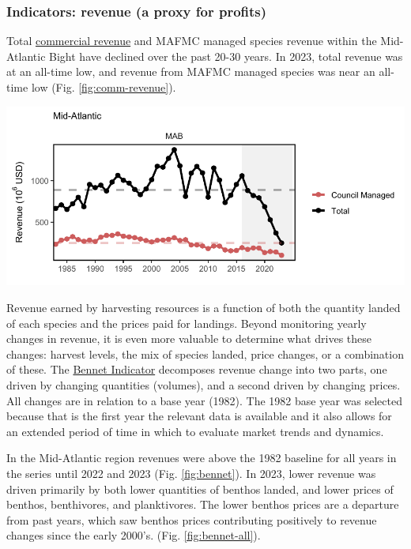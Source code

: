 \documentclass[
  10pt,
]{article}
\let\origfigure\figure
\let\endorigfigure\endfigure
\renewenvironment{figure}[1][2] {
    \expandafter\origfigure\expandafter[H]
} {
    \endorigfigure
}
\begin{document}
\subsubsection{Indicators: revenue (a proxy for profits)}\label{indicators-revenue-a-proxy-for-profits}

Total \href{https://noaa-edab.github.io/catalog/comdat.html}{commercial revenue} and MAFMC managed species revenue within the Mid-Atlantic Bight have declined over the past 20-30 years. In 2023, total revenue was at an all-time low, and revenue from MAFMC managed species was near an all-time low (Fig. \ref{fig:comm-revenue}).

\begin{figure}

{\centering \includegraphics{midatlantic_files/figure-latex/comm-revenue-1} 

}

\caption{Revenue for the for the Mid-Atlantic region: total (black) and from MAFMC managed species (red).}\label{fig:comm-revenue}
\end{figure}

Revenue earned by harvesting resources is a function of both the quantity landed of each species and the prices paid for landings. Beyond monitoring yearly changes in revenue, it is even more valuable to determine what drives these changes: harvest levels, the mix of species landed, price changes, or a combination of these. The \href{https://noaa-edab.github.io/catalog/bennet.html}{Bennet Indicator} decomposes revenue change into two parts, one driven by changing quantities (volumes), and a second driven by changing prices. All changes are in relation to a base year (1982). The 1982 base year was selected because that is the first year the relevant data is available and it also allows for an extended period of time in which to evaluate market trends and dynamics.

In the Mid-Atlantic region revenues were above the 1982 baseline for all years in the series until 2022 and 2023 (Fig. \ref{fig:bennet}). In 2023, lower revenue was driven primarily by both lower quantities of benthos landed, and lower prices of benthos, benthivores, and planktivores. The lower benthos prices are a departure from past years, which saw benthos prices contributing positively to revenue changes since the early 2000's. (Fig. \ref{fig:bennet-all}).
\end{document}
